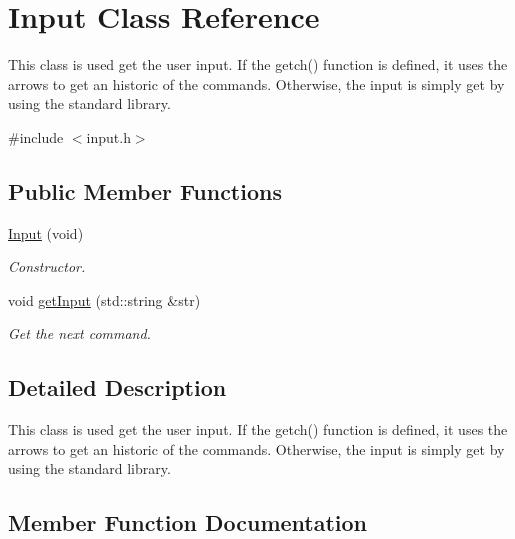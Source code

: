 \hypertarget{class_input}{}\section{Input Class Reference}
\label{class_input}


This class is used get the user input. If the getch() function is defined, it uses the arrows to get an historic of the commands. Otherwise, the input is simply get by using the standard library.  




{\ttfamily \#include $<$input.\+h$>$}

\subsection*{Public Member Functions}
\begin{DoxyCompactItemize}
\item 
\hypertarget{class_input_aba4266a8d6f4a95e101d66ca72544fe9}{}\hyperlink{class_input_aba4266a8d6f4a95e101d66ca72544fe9}{Input} (void)\label{class_input_aba4266a8d6f4a95e101d66ca72544fe9}

\begin{DoxyCompactList}\small\item\em Constructor. \end{DoxyCompactList}\item 
void \hyperlink{class_input_a1fd743c876434a6aff0aa24c08abacec}{get\+Input} (std\+::string \&str)
\begin{DoxyCompactList}\small\item\em Get the next command. \end{DoxyCompactList}\end{DoxyCompactItemize}


\subsection{Detailed Description}
This class is used get the user input. If the getch() function is defined, it uses the arrows to get an historic of the commands. Otherwise, the input is simply get by using the standard library. 

\subsection{Member Function Documentation}
\hypertarget{class_input_a1fd743c876434a6aff0aa24c08abacec}{}
